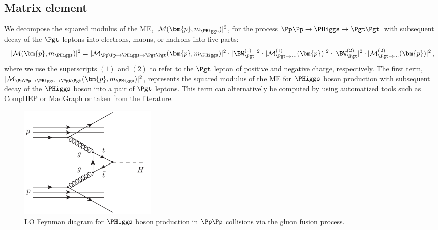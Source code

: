 \subsection{Matrix element}
\label{sec:mem_ME}

We decompose the squared modulus of the ME, $\vert \mathcal{M}(\bm{p},m_{\PHiggs}) \vert^{2}$, for the process $\Pp\Pp \to \PHiggs \to \Pgt\Pgt$
with subsequent decay of the $\Pgt$ leptons into electrons, muons, or
hadrons into five parts:
\begin{equation}
\vert \mathcal{M}(\bm{p},m_{\PHiggs}) \vert^{2} = 
 \vert \mathcal{M}_{\Pp\Pp \to \PHiggs \to
   \Pgt\Pgt}(\bm{p},m_{\PHiggs}) \vert^{2} 
\cdot \vert \BW_{\Pgt}^{(1)} \vert^{2} 
\cdot \vert \mathcal{M}^{(1)}_{\Pgt\to\cdots}(\bm{p}) \vert^{2} 
\cdot \vert \BW_{\Pgt}^{(2)} \vert^{2} 
\cdot \vert \mathcal{M}^{(2)}_{\Pgt\to\cdots}(\bm{p}) \vert^{2}  \, ,
 \label{eq:meFactorization}
\end{equation}
where we use the superscripts $(1)$ and $(2)$ to refer to the $\Pgt$ lepton of positive and negative charge, respectively.
The first term, $\vert \mathcal{M}_{\Pp\Pp \to \PHiggs \to
  \Pgt\Pgt}(\bm{p},m_{\PHiggs}) \vert^{2}$, represents the squared
modulus of the ME for $\PHiggs$ boson production with subsequent decay of the $\PHiggs$ boson into a pair of $\Pgt$ leptons.
This term can alternatively be computed by using automatized tools such as CompHEP or MadGraph or taken from the literature.

\begin{figure}
\begin{center}
\includegraphics*[height=54mm]{figures/ggH_FeynmanDiagram.pdf}
\end{center}
\caption{
  LO Feynman diagram for $\PHiggs$ boson production in $\Pp\Pp$ collisions via the gluon fusion process.
}
\label{fig:ggH_FeynmanDiagram}
\end{figure}

